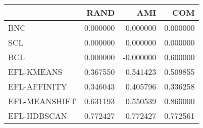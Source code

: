\begin{tabular}{lrrr}
\toprule
 & RAND & AMI & COM \\
\midrule
BNC & 0.000000 & 0.000000 & 0.000000 \\
SCL & 0.000000 & 0.000000 & 0.000000 \\
BCL & 0.000000 & -0.000000 & 0.600000 \\
EFL-KMEANS & 0.367550 & 0.541423 & 0.509855 \\
EFL-AFFINITY & 0.346043 & 0.405796 & 0.336258 \\
EFL-MEANSHIFT & 0.631193 & 0.550539 & 0.860000 \\
EFL-HDBSCAN & 0.772427 & 0.772427 & 0.772561 \\
\bottomrule
\end{tabular}
